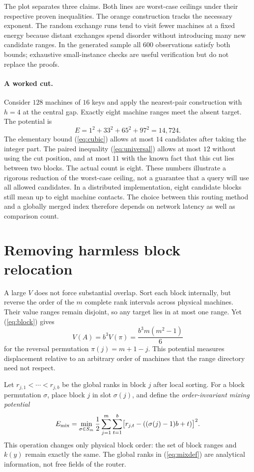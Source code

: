 \documentclass[10pt,letterpaper]{article}
\begin{document}
The plot separates three claims. Both lines are worst-case ceilings under their respective proven inequalities. The orange construction tracks the necessary exponent. The random exchange runs tend to visit fewer machines at a fixed energy because distant exchanges spend disorder without introducing many new candidate ranges. In the generated sample all 600 observations satisfy both bounds; exhaustive small-instance checks are useful verification but do not replace the proofs.

\paragraph{A worked cut.} Consider $128$ machines of $16$ keys and apply the nearest-pair construction with $h=4$ at the central gap. Exactly eight machine ranges meet the absent target. The potential is
\[
E=1^2+33^2+65^2+97^2=14{,}724.
\]
The elementary bound (\ref{eq:cubic}) allows at most $14$ candidates after taking the integer part. The paired inequality (\ref{eq:universal}) allows at most $12$ without using the cut position, and at most $11$ with the known fact that this cut lies between two blocks. The actual count is eight. These numbers illustrate a rigorous reduction of the worst-case ceiling, not a guarantee that a query will use all allowed candidates. In a distributed implementation, eight candidate blocks still mean up to eight machine contacts. The choice between this routing method and a globally merged index therefore depends on network latency as well as comparison count.

\section{Removing harmless block relocation}
A large $V$ does not force substantial overlap. Sort each block internally, but reverse the order of the $m$ complete rank intervals across physical machines. Their value ranges remain disjoint, so any target lies in at most one range. Yet (\ref{eq:block}) gives
\[
 V(A)=b^3V(\pi)=\frac{b^3m(m^2-1)}6
\]
for the reversal permutation $\pi(j)=m+1-j$. This potential measures displacement relative to an arbitrary order of machines that the range directory need not respect.

Let $r_{j,1}<\cdots<r_{j,b}$ be the global ranks in block $j$ after local sorting. For a block permutation $\sigma$, place block $j$ in slot $\sigma(j)$, and define the \emph{order-invariant mixing potential}
\begin{equation}\label{eq:mixdef}
 E_{\rm mix}=\min_{\sigma\in S_m}\frac12\sum_{j=1}^{m}\sum_{t=1}^{b}
 \bigl[r_{j,t}-((\sigma(j)-1)b+t)\bigr]^2.
\end{equation}
This operation changes only physical block order: the set of block ranges and $k(y)$ remain exactly the same. The global ranks in (\ref{eq:mixdef}) are analytical information, not free fields of the router.
\end{document}
